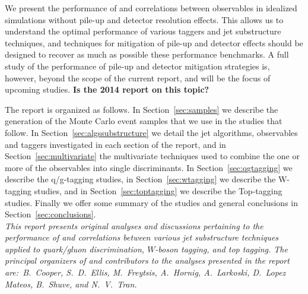 We present the performance of and correlations between observables in  idealized simulations without pile-up and detector resolution effects. This allows us to understand the optimal performance of various taggers and jet substructure techniques, and techniques for mitigation of pile-up and detector effects should be designed to recover as much as possible these performance benchmarks. A full study of the performance of pile-up and detector mitigation strategies is, however, beyond the scope of the current report, and will be the focus of upcoming studies. {\bf Is the 2014 report on this topic?}


The report is organized as follows. In Section~\ref{sec:samples} we describe the generation of the Monte Carlo event samples that we use in the studies that follow. In Section~\ref{sec:algssubstructure} we detail the jet algorithms, observables and taggers investigated in each section of the report, and in Section~\ref{sec:multivariate} the multivariate techniques used to combine the one or more of the observables into single discriminants. In Section~\ref{sec:qgtagging} we describe the q/g-tagging studies, in Section~\ref{sec:wtagging} we describe the W-tagging studies, and in Section~\ref{sec:toptagging} we describe the Top-tagging studies. Finally we offer some summary of the studies and general conclusions in Section~\ref{sec:conclusions}.\\

\emph{This report presents original analyses and discussions pertaining to the performance of and correlations between various jet substructure techniques applied to quark/gluon discrimination, $W$-boson tagging, and top tagging. The principal organizers of and contributors to the analyses presented in the report are:~B.~Cooper, S.~D.~Ellis, M.~Freytsis, A.~Hornig, A.~Larkoski, D.~Lopez Mateos, B.~Shuve, and N.~V.~Tran.}